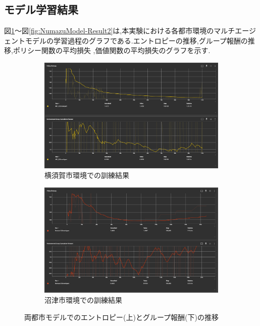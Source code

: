 \subsection{モデル学習結果}
図\ref{fig:YokosukaModel-Result}～図\ref{fig:NumazuModel-Result2}は,本実験における各都市環境のマルチエージェントモデルの学習過程のグラフである.エントロピーの推移,グループ報酬の推移,ポリシー関数の平均損失
,価値関数の平均損失のグラフを示す.
\begin{figure}[H]
  \centering
  \begin{subfigure}{0.45\textwidth}
      \centering
      \includegraphics[width=\textwidth]{Figures/YokosukaModel-Result.png}
      \caption{横須賀市環境での訓練結果}
      \label{fig:YokosukaModel-Result}
  \end{subfigure}
  \begin{subfigure}{0.45\textwidth}
      \centering
      \includegraphics[width=\textwidth]{Figures/NumazuModel-Result.png}
      \caption{沼津市環境での訓練結果}
      \label{fig:NumazuModel-Result}
  \end{subfigure}
  \caption{両都市モデルでのエントロピー(上)とグループ報酬(下)の推移}
  \label{fig:Model-Result1}
\end{figure}
